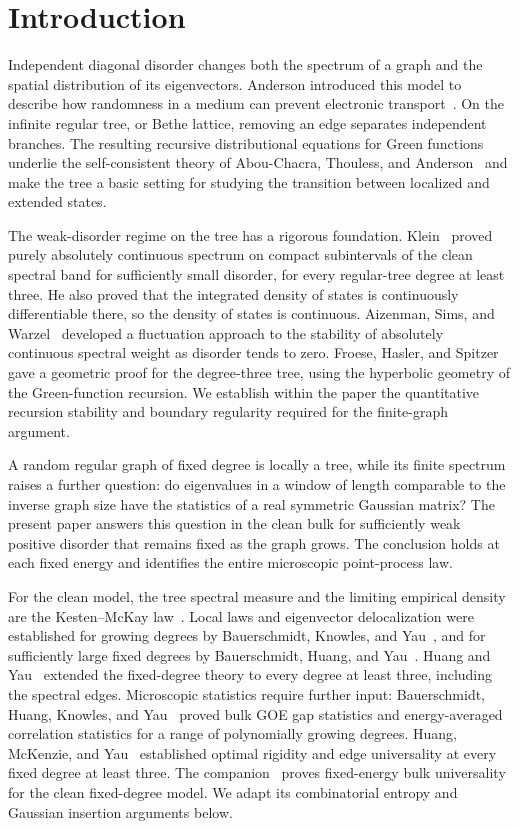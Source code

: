 \section{Introduction}\label{sec:introduction}

Independent diagonal disorder changes both the spectrum of a graph and
the spatial distribution of its eigenvectors.  Anderson introduced this
model to describe how randomness in a medium can prevent electronic
transport~\cite{Anderson1958}.  On the infinite regular tree, or Bethe
lattice, removing an edge separates independent branches.  The resulting
recursive distributional equations for Green functions underlie the
self-consistent theory of Abou-Chacra, Thouless, and
Anderson~\cite{AAT1973} and make the tree a basic setting for studying
the transition between localized and extended states.

The weak-disorder regime on the tree has a rigorous foundation.
Klein~\cite{Klein1994,Klein1998} proved purely absolutely continuous
spectrum on compact subintervals of the clean spectral band for
sufficiently small disorder, for every regular-tree degree at least
three.  He also proved that the integrated density of states is
continuously differentiable there, so the density of states is
continuous.  Aizenman, Sims, and Warzel~\cite{ASW2006} developed a
fluctuation approach to the stability of absolutely continuous spectral
weight as disorder tends to zero.  Froese, Hasler, and
Spitzer~\cite{FHS2007} gave a geometric proof for the degree-three tree,
using the hyperbolic geometry of the Green-function recursion.  We
establish within the paper the quantitative recursion stability and
boundary regularity required for the finite-graph argument.

A random regular graph of fixed degree is locally a tree, while its
finite spectrum raises a further question: do eigenvalues in a window
of length comparable to the inverse graph size have the statistics of
a real symmetric Gaussian matrix?  The present paper answers this
question in the clean bulk for sufficiently weak positive disorder that
remains fixed as the graph grows.  The conclusion holds at each fixed
energy and identifies the entire microscopic point-process law.

For the clean model, the tree spectral measure and the limiting empirical
density are the Kesten--McKay law~\cite{Kesten1959,McKay1981}.
Local laws and eigenvector delocalization were established for growing
degrees by Bauerschmidt, Knowles, and Yau~\cite{BKY2017Local}, and for
sufficiently large fixed degrees by Bauerschmidt, Huang, and
Yau~\cite{BHY2019Local}.  Huang and Yau~\cite{HY2024Spectrum} extended
the fixed-degree theory to every degree at least three, including the
spectral edges.  Microscopic statistics require further input:
Bauerschmidt, Huang, Knowles, and Yau~\cite{BHKY2017} proved bulk GOE
gap statistics and energy-averaged correlation statistics for
a range of polynomially growing degrees.  Huang, McKenzie, and
Yau~\cite{HMY2024Edge} established optimal rigidity and edge universality
at every fixed degree at least three.  The companion~\cite{bu} proves
fixed-energy bulk universality for the clean fixed-degree model.  We
adapt its combinatorial entropy and Gaussian insertion arguments below.

